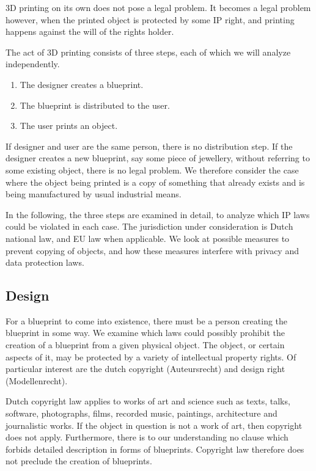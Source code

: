 3D printing on its own does not pose a legal problem.
It becomes a legal problem however, when the printed object is protected by 
some IP right, and printing happens against the will of the rights holder.

The act of 3D printing consists of three steps, each of which we will analyze 
independently.
\begin{enumerate}
  \item The designer creates a blueprint.
  \item The blueprint is distributed to the user.
  \item The user prints an object.
\end{enumerate}

If designer and user are the same person, there is no distribution step.
If the designer creates a new blueprint, say some piece of jewellery, without referring to some existing object, there is no legal problem.
We therefore consider the case where the object being printed is a copy of something that already exists and is being manufactured by usual industrial means.

In the following, the three steps are examined in detail, to analyze which IP laws could be violated in each case.
The jurisdiction under consideration is Dutch national law, and EU law when applicable.
We look at possible measures to prevent copying of objects, and how these measures interfere with privacy and data protection laws.

\subsection{Design}
For a blueprint to come into existence, there must be a person creating the blueprint in some way.
We examine which laws could possibly prohibit the creation of a blueprint from a given physical object.
The object, or certain aspects of it, may be protected by a variety of intellectual property rights.
Of particular interest are the dutch copyright (Auteursrecht) and design right (Modellenrecht).

Dutch copyright law applies to works of art and science such as texts, talks, software, photographs, films, recorded music, paintings, architecture and journalistic works. %
If the object in question is not a work of art, then copyright does not apply. Furthermore, there is to our understanding no clause which forbids detailed description in forms of blueprints.
Copyright law therefore does not preclude the creation of blueprints.

